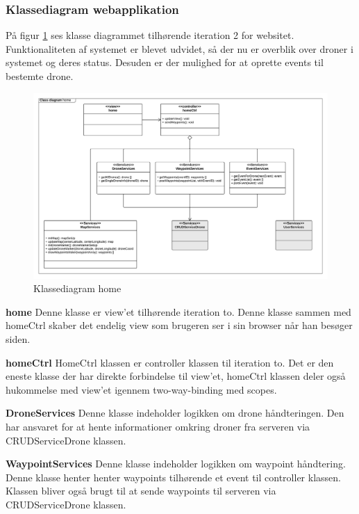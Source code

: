\subsubsection*{Klassediagram webapplikation}
\vspace{-0.1cm}
På figur \ref{fig:classDiagram_home} ses klasse diagrammet tilhørende iteration 2 for websitet. Funktionaliteten af systemet er blevet udvidet, så der nu er overblik over droner i systemet og deres status. Desuden er der mulighed for at oprette events til bestemte drone. 
\begin{figure}[H]
	\centering
	\includegraphics[width=1.\textwidth]{Billeder/klasse_diagrammer/home_class_diagram.png}
	\vspace{-0.5cm}
	\caption{Klassediagram home}
	\label{fig:classDiagram_home}
\end{figure}

\textbf{home}
Denne klasse er view'et tilhørende iteration to. Denne klasse sammen med homeCtrl skaber det endelig view som brugeren ser i sin browser når han besøger siden.

\textbf{homeCtrl}
HomeCtrl klassen er controller klassen til iteration to. Det er den eneste klasse der har direkte forbindelse til view'et, homeCtrl klassen deler også hukommelse med view'et igennem two-way-binding med scopes.

\textbf{DroneServices}
Denne klasse indeholder logikken om drone håndteringen. Den har ansvaret for at hente informationer omkring droner fra serveren via CRUDServiceDrone klassen.

\textbf{WaypointServices}
Denne klasse indeholder logikken om waypoint håndtering. Denne klasse henter henter waypoints tilhørende et event til controller klassen. Klassen bliver også brugt til at sende waypoints til serveren via CRUDServiceDrone klassen.

